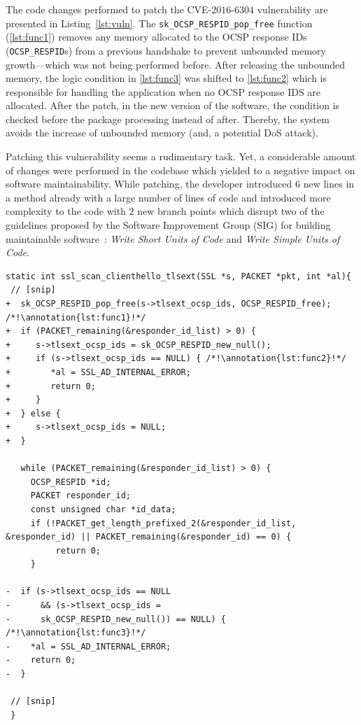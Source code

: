 \documentclass[smallextended]{svjour3}       %
\newcounter{lstannotation}
\renewcommand{\thelstannotation}{\ding{\number\numexpr181+\arabic{lstannotation}}}
\newcommand{\annotation}[1]{\refstepcounter{lstannotation}\label{#1}\thelstannotation}
\begin{document}
The code changes performed to patch the CVE-$2016$-$6304$ vulnerability are 
presented in Listing~\ref{lst:vuln}. The \texttt{sk\_OCSP\_RESPID\_pop\_free} function 
(\ref{lst:func1}) removes any memory allocated to the OCSP response IDs 
(\texttt{OCSP\_RESPID}s) from a previous handshake to prevent unbounded 
memory growth---which was not being performed before.
After releasing the unbounded memory, the logic condition in 
\ref{lst:func3} was shifted to \ref{lst:func2} which is responsible 
for handling the application when no OCSP response IDS are 
allocated. After the patch, in the new version of the software, the 
condition is checked before the package processing 
instead of after. Thereby, the system avoids the increase of 
unbounded memory (and, a potential DoS attack).

Patching this vulnerability seems a rudimentary task. Yet,
a considerable amount of changes were performed in the codebase 
which yielded to a negative impact on software maintainability.
While patching, the developer introduced $6$ new lines in a method 
already with a large number of lines of code and introduced more 
complexity to the code with $2$ new branch points which disrupt two of 
the guidelines proposed by the Software Improvement Group 
(SIG) for building maintainable software~\cite{Visser:2016:OREILLY}: 
\emph{Write Short Units of Code} and \emph{Write Simple Units of 
Code}. 

\medskip
\setcounter{lstannotation}{0}
\begin{lstlisting}[style={CStyle}, caption={Patch provided by OpenSSL developers to the
CVE-2016-6304 vulnerability on file ssl/t1\_lib.c},label={lst:vuln}]
static int ssl_scan_clienthello_tlsext(SSL *s, PACKET *pkt, int *al){ 
 // [snip]
+  sk_OCSP_RESPID_pop_free(s->tlsext_ocsp_ids, OCSP_RESPID_free); /*!\annotation{lst:func1}!*/
+  if (PACKET_remaining(&responder_id_list) > 0) { 
+     s->tlsext_ocsp_ids = sk_OCSP_RESPID_new_null();
+     if (s->tlsext_ocsp_ids == NULL) { /*!\annotation{lst:func2}!*/
+        *al = SSL_AD_INTERNAL_ERROR;
+        return 0;
+     }
+  } else {
+     s->tlsext_ocsp_ids = NULL;
+  }

   while (PACKET_remaining(&responder_id_list) > 0) {
     OCSP_RESPID *id;
     PACKET responder_id;
     const unsigned char *id_data;
     if (!PACKET_get_length_prefixed_2(&responder_id_list, &responder_id) || PACKET_remaining(&responder_id) == 0) {
          return 0;
     }

-  if (s->tlsext_ocsp_ids == NULL 
-      && (s->tlsext_ocsp_ids = 
-      sk_OCSP_RESPID_new_null()) == NULL) { /*!\annotation{lst:func3}!*/
-    *al = SSL_AD_INTERNAL_ERROR;
-    return 0;
-  }

 // [snip]
 }
\end{lstlisting}
\end{document}
